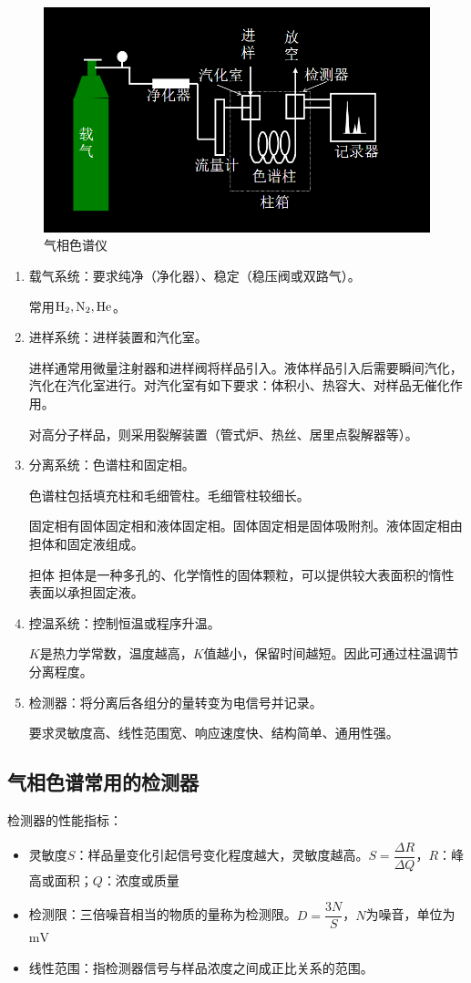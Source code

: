 \begin{figure}[!h]
	\centering
	\includegraphics[width=0.7\linewidth]{image/chp1_GC_apa}
	\caption{气相色谱仪}
	\label{fig:chp1gcapa}
\end{figure}
\begin{enumerate}
	\item 载气系统：要求纯净（净化器）、稳定（稳压阀或双路气）。
	
	常用$\ce{H2,N2,He}$。
	\item 进样系统：进样装置和汽化室。
	
	进样通常用微量注射器和进样阀将样品引入。液体样品引入后需要瞬间汽化，汽化在汽化室进行。对汽化室有如下要求：体积小、热容大、对样品无催化作用。
	
	对高分子样品，则采用裂解装置（管式炉、热丝、居里点裂解器等）。
	\item 分离系统：色谱柱和固定相。
	
	色谱柱包括填充柱和毛细管柱。毛细管柱较细长。
	
	固定相有固体固定相和液体固定相。固体固定相是固体吸附剂。液体固定相由担体和固定液组成。
	
	\begin{definition*}{担体}{}
		担体是一种多孔的、化学惰性的固体颗粒，可以提供较大表面积的惰性表面以承担固定液。
	\end{definition*}
	\item 控温系统：控制恒温或程序升温。
	
	$K$是热力学常数，温度越高，$K$值越小，保留时间越短。因此可通过柱温调节分离程度。
	\item 检测器：将分离后各组分的量转变为电信号并记录。
	
	要求灵敏度高、线性范围宽、响应速度快、结构简单、通用性强。
\end{enumerate}

\subsection{气相色谱常用的检测器}
检测器的性能指标：
\begin{itemize}
	\item 灵敏度$S$：样品量变化引起信号变化程度越大，灵敏度越高。$S=\dfrac{\Delta R}{\Delta  Q}$，$R$：峰高或面积；$Q$：浓度或质量
	\item 检测限：三倍噪音相当的物质的量称为检测限。$D=\dfrac{3N}{S}$，$N$为噪音，单位为$\mathrm{mV}$
	\item 线性范围：指检测器信号与样品浓度之间成正比关系的范围。
\end{itemize}

